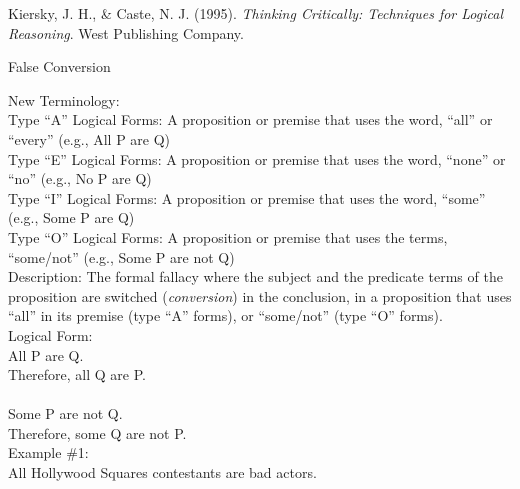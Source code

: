 \documentclass[a4paper,12pt,single,pdftex]{scrartcl}
\begin{document}
      
        
          Kiersky, J. H., \& Caste, N. J. (1995). {\it Thinking Critically: Techniques for Logical Reasoning}. West Publishing Company.
        
      
    
  

False Conversion
    
      New Terminology:
    \\

    
      Type “A” Logical Forms: A proposition or premise that uses the word, “all” or “every” (e.g., All P are Q)
    \\

    
      Type “E” Logical Forms: A proposition or premise that uses the word, “none” or “no” (e.g., No P are Q)
    \\

    
      Type “I” Logical Forms: A proposition or premise that uses the word, “some” (e.g., Some P are Q)
    \\

    
      Type “O” Logical Forms: A proposition or premise that uses the terms, “some/not” (e.g., Some P are not Q)
    \\

    
      Description: The formal fallacy where the subject and the predicate terms of the proposition are switched ({\it conversion}) in the conclusion, in a proposition that uses “all” in its premise (type “A” forms), or “some/not” (type “O” forms).
    \\

    
      Logical Form:
    \\

    
      All P are Q.
    \\

    
      Therefore, all Q are P.
    \\

    
       
    \\

    
      Some P are not Q.
    \\

    
      Therefore, some Q are not P.
    \\

    
      Example \#1:
    \\

    
      All Hollywood Squares contestants are bad actors.
    \\
\end{document}
